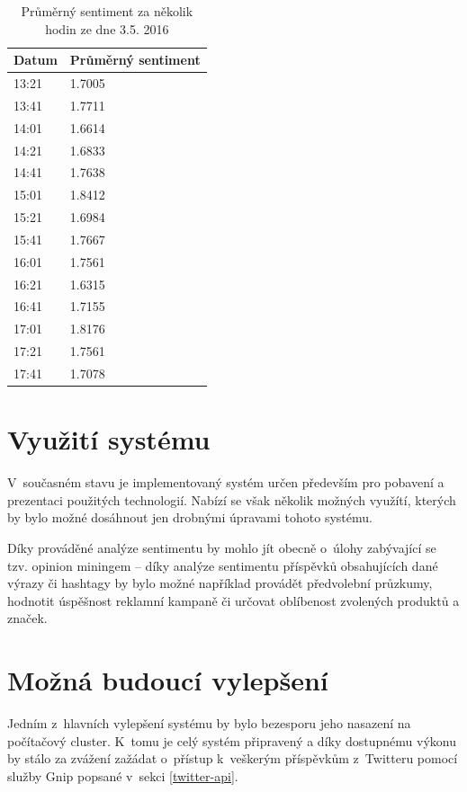 \documentclass[thesis=B,czech]{FITthesis}[2012/06/26]
\begin{document}
\begin{table}[h]
\centering
\begin{tabular}{|l|l|}
\hline
Datum            & Průměrný sentiment \\ \hline
13:21 & 1.7005 \\ \hline
13:41 & 1.7711  \\ \hline
14:01 & 1.6614 \\ \hline
14:21 & 1.6833 \\ \hline
14:41 & 1.7638  \\ \hline
15:01 & 1.8412  \\ \hline
15:21 & 1.6984 \\ \hline
15:41 & 1.7667 \\ \hline
16:01 & 1.7561 \\ \hline
16:21 & 1.6315 \\ \hline
16:41 & 1.7155 \\ \hline
17:01 & 1.8176 \\ \hline
17:21 & 1.7561 \\ \hline
17:41 & 1.7078 \\ \hline
\end{tabular}
\caption{Průměrný sentiment za několik hodin ze dne 3.5. 2016}
\label{sentiment-table}
\end{table}

\section{Využití systému}
V~současném stavu je implementovaný systém určen především pro pobavení a prezentaci použitých technologií. Nabízí se však několik možných využítí, kterých by bylo možné dosáhnout jen drobnými úpravami tohoto systému. 

Díky prováděné analýze sentimentu by mohlo jít obecně o~úlohy zabývající se tzv. opinion miningem -- díky analýze sentimentu příspěvků obsahujících dané výrazy či hashtagy by bylo možné například provádět předvolební průzkumy, hodnotit úspěšnost reklamní kampaně či určovat oblíbenost zvolených produktů a značek. 


\section{Možná budoucí vylepšení}
Jedním z~hlavních vylepšení systému by bylo bezesporu jeho nasazení na počítačový cluster. K~tomu je celý systém připravený a díky dostupnému výkonu by stálo za zvážení zažádat o~přístup k~veškerým příspěvkům z~Twitteru pomocí služby Gnip popsané v~sekci \ref{twitter-api}. 
\end{document}
